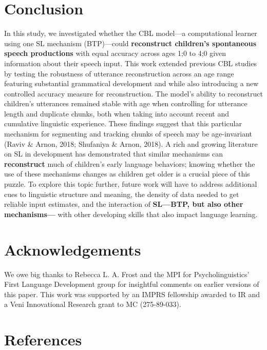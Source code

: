 \documentclass[
  english,
  man,mask,floatsintext]{apa6}
\begin{document}
\hypertarget{conclusion}{%
\section{Conclusion}\label{conclusion}}

In this study, we investigated whether the CBL model---a computational learner using one SL mechanism (BTP)---could \textbf{reconstruct children's spontaneous speech productions} with equal accuracy across ages 1;0 to 4;0 given information about their speech input. This work extended previous CBL studies by testing the robustness of utterance reconstruction across an age range featuring substantial grammatical development and while also introducing a new controlled accuracy measure for reconstruction. The model's ability to reconstruct children's utterances remained stable with age when controlling for utterance length and duplicate chunks, both when taking into account recent and cumulative linguistic experience. These findings suggest that this particular mechanism for segmenting and tracking chunks of speech may be age-invariant (Raviv \& Arnon, 2018; Shufaniya \& Arnon, 2018). A rich and growing literature on SL in development has demonstrated that similar mechanisms can \textbf{reconstruct} much of children's early language behaviors; knowing whether the use of these mechanisms changes as children get older is a crucial piece of this puzzle. To explore this topic further, future work will have to address additional cues to linguistic structure and meaning, the density of data needed to get reliable input estimates, and the interaction of \textbf{SL---BTP, but also other mechanisms---} with other developing skills that also impact language learning.

\hypertarget{acknowledgements}{%
\section{Acknowledgements}\label{acknowledgements}}

We owe big thanks to Rebecca L. A. Frost and the MPI for Psycholinguistics' First Language Development group for insightful comments on earlier versions of this paper. This work was supported by an IMPRS fellowship awarded to IR and a Veni Innovational Research grant to MC (275-89-033).

\newpage

\hypertarget{references}{%
\section{References}\label{references}}
\end{document}
